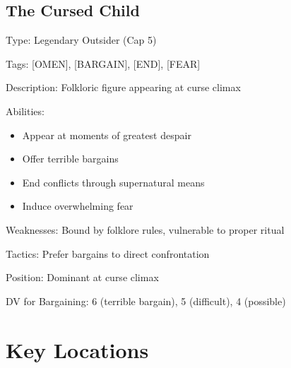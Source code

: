 \documentclass[11pt]{article}
\newenvironment{npc}[1]{\begin{description}[leftmargin=*,style=standard]\item[\textbf{#1}]}{\end{description}}
\begin{document}
\subsection{The Cursed Child}
\begin{npc}{The Cursed Child}
\item[Type:] Legendary Outsider (Cap 5)
\item[Tags:] [OMEN], [BARGAIN], [END], [FEAR]
\item[Description:] Folkloric figure appearing at curse climax
\item[Abilities:] 
  \begin{itemize}
    \item Appear at moments of greatest despair
    \item Offer terrible bargains
    \item End conflicts through supernatural means
    \item Induce overwhelming fear
  \end{itemize}
\item[Weaknesses:] Bound by folklore rules, vulnerable to proper ritual
\item[Tactics:] Prefer bargains to direct confrontation
\item[Position:] Dominant at curse climax
\item[DV for Bargaining:] 6 (terrible bargain), 5 (difficult), 4 (possible)
\end{npc}

\section{Key Locations}
\end{document}
